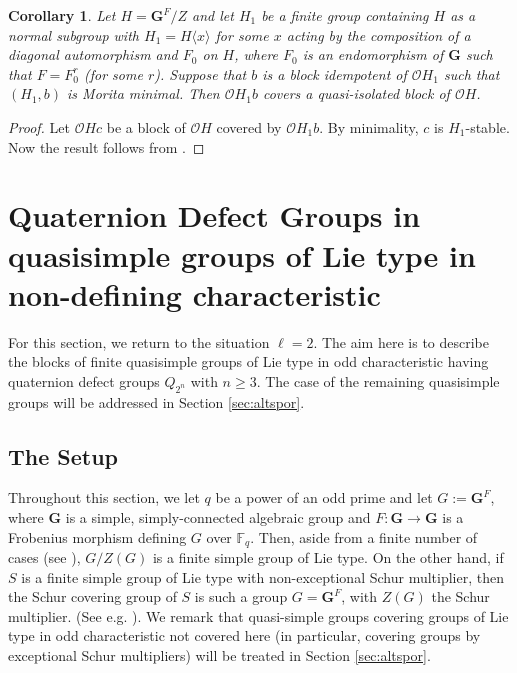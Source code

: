\documentclass{amsart}
\theoremstyle{plain}\newtheorem{Theorem}{Theorem}[section]
\theoremstyle{plain}\newtheorem{Conjecture}[Theorem]{Conjecture}
\theoremstyle{plain}\newtheorem{Corollary}[Theorem]{Corollary}
\theoremstyle{plain}\newtheorem{Lemma}[Theorem]{Lemma}
\theoremstyle{plain}\newtheorem{Proposition}[Theorem]{Proposition}
\theoremstyle{definition}\newtheorem{Definition}[Theorem]{Definition}
\theoremstyle{definition}\newtheorem{Example}[Theorem]{Example}
\theoremstyle{definition}\newtheorem{Examples}[Theorem]{Examples}
\theoremstyle{definition}\newtheorem{Exercise}[Theorem]{Exercise}
\theoremstyle{definition}\newtheorem{Notation}[Theorem]{Notation}
\theoremstyle{definition}\newtheorem{Remark}[Theorem]{Remark}
\theoremstyle{definition}\newtheorem{Remarks}[Theorem]{Remarks}
\def\CO{{\mathcal{O}}}    \def\OPE{{\mathcal{O}(P\rtimes E)}}
\newcommand{\bG}{{\mathbf{G}}}
\newcommand{\zent} {Z}
\newcommand{\FF}{\mathbb{F}}
\numberwithin{equation}{section}
\begin{document}
\begin{Corollary}  Let   $H  =\bG^F/Z$ and  let $H_1$  be  a  finite group  containing $H$ as a normal subgroup with $H_1= H \langle x\rangle $  for some $x$ acting by  the  composition of  a diagonal   automorphism  and $F_0$  on  $H$, where  $F_0$  is an  endomorphism of $\bG$ such that   $F =F_0^r$  (for some $r$).  Suppose that $b$ is a block idempotent of $\CO H_1$ such that $(H_1, b)$ is Morita minimal. Then $\CO H_1b$  covers a quasi-isolated block of $\CO H$.
\end{Corollary}

\begin{proof}  Let $\CO Hc$  be a block of $\CO H $ covered by $\CO H_1b$. By  minimality, $c$ is $H_1$-stable. Now the result follows  from .\end{proof}






\section{Quaternion Defect Groups in quasisimple groups of Lie type in non-defining characteristic}\label{sec:lie-non}


For this section, we return to the situation $\ell=2$. The aim here is to describe the blocks of finite quasisimple groups of Lie type in odd characteristic having quaternion defect groups $Q_{2^n}$ with $n\geq 3$. The case of the remaining quasisimple groups will be addressed in Section \ref{sec:altspor}. 






 
\subsection{The Setup}\label{sec:setup}
Throughout  this section, we let $q$ be a power of an odd prime and let $G:=\bG^F$, where $\bG$ is a simple, simply-connected algebraic group and $F\colon \bG\rightarrow\bG$ is a Frobenius morphism defining $G$ over $\FF_q$. Then, aside from a finite number of cases (see \cite[Thm.~24.17]{MT}), $G/\zent(G)$ is a finite simple group of Lie type. On the other hand, if $S$ is a finite simple group of Lie type with non-exceptional Schur multiplier, then the Schur covering group of $S$ is such a group $G=\bG^F$, with $\zent(G)$ the Schur multiplier. (See e.g.  \cite[Rem.~24.19]{MT}). We remark that quasi-simple groups covering groups of Lie type in odd characteristic not covered here (in particular, covering groups by exceptional Schur multipliers) will be treated in Section \ref{sec:altspor}.
\end{document}
